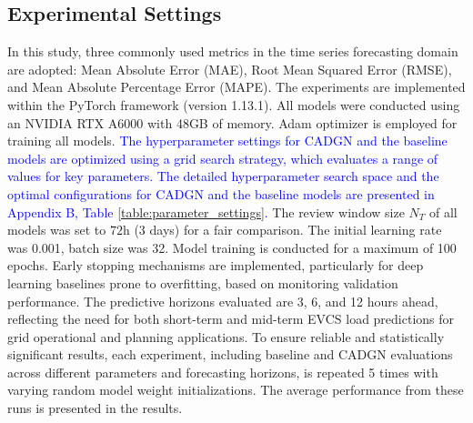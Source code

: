 \documentclass[lettersize,journal]{IEEEtran}
\newcommand{\hl}[1]{\textcolor{blue}{#1}}
\begin{document}
\vspace{-7pt}
\subsection{Experimental Settings}

In this study, three commonly used metrics in the time series forecasting domain are adopted:  Mean Absolute Error (MAE),  Root Mean Squared Error (RMSE), and Mean Absolute Percentage Error (MAPE). The experiments are implemented within the PyTorch framework (version 1.13.1). All models were conducted using an NVIDIA RTX A6000 with 48GB of memory. Adam optimizer is employed for training all models. 
\hl{The hyperparameter settings for CADGN and the baseline models are optimized using a grid search strategy, which evaluates a range of values for key parameters. The detailed hyperparameter search space and the optimal configurations for CADGN and the baseline models are presented in Appendix B, Table \ref{table:parameter_settings}.}
The review window size $N_T$ of all models was set to $72$h (3 days) for a fair comparison. The initial learning rate was 0.001, batch size was 32. Model training is conducted for a maximum of 100 epochs. Early stopping mechanisms are implemented, particularly for deep learning baselines prone to overfitting, based on monitoring validation performance. The predictive horizons evaluated are 3, 6, and 12 hours ahead, reflecting the need for both short-term and mid-term EVCS load predictions for grid operational and planning applications.  
To ensure reliable and statistically significant results, each experiment, including baseline and CADGN evaluations across different parameters and forecasting horizons, is repeated 5 times with varying random model weight initializations. The average performance from these runs is presented in the results.

\end{document}
